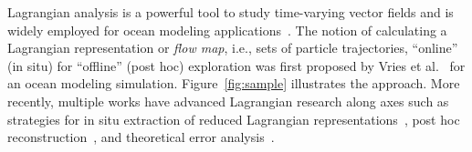 %
Lagrangian analysis is a powerful tool to study time-varying vector fields and is widely employed for ocean modeling applications~\cite{VANSEBILLE201849}.
%
The notion of calculating a Lagrangian representation or \textit{flow map}, i.e., sets of particle trajectories, ``online'' (in situ) for ``offline'' (post hoc) exploration was first proposed by Vries et al.~\cite{vries2001calculating} for an ocean modeling simulation.
%
Figure~\ref{fig:sample} illustrates the approach.
%
%
%
%
%
More recently, multiple works have advanced Lagrangian research along axes such as strategies for in situ extraction of reduced Lagrangian representations~\cite{agranovsky2014improved}\cite{rapp2019void}\cite{sane2020scalable}, post hoc reconstruction~\cite{chandler2015interpolation}\cite{sane2019interpolation}\cite{Jakob20}, and theoretical error analysis~\cite{bujack2015lagrangian}\cite{chandler2016analysis}\cite{hummel2016error}.
%
%
%

